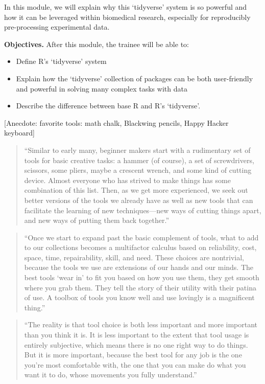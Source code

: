 \documentclass[]{tufte-book}
\providecommand{\tightlist}{%
  \setlength{\itemsep}{0pt}\setlength{\parskip}{0pt}}
\begin{document}
In this module, we will explain why this `tidyverse' system is so
powerful and how it can be leveraged within biomedical research, especially for
reproducibly pre-processing experimental data.

\textbf{Objectives.} After this module, the trainee will be able to:

\begin{itemize}
\tightlist
\item
  Define R's `tidyverse' system
\item
  Explain how the `tidyverse' collection of packages can be both user-friendly
  and powerful in solving many complex tasks with data
\item
  Describe the difference between base R and R's `tidyverse'.
\end{itemize}

{[}Anecdote: favorite tools: math chalk, Blackwing pencils, Happy Hacker keyboard{]}

\begin{quote}
``Similar to early many, beginner makers start with a rudimentary set of tools for
basic creative tasks: a hammer (of course), a set of screwdrivers, scissors,
some pliers, maybe a crescent wrench, and some kind of cutting device. Almost
everyone who has strived to make things has some combination of this list. Then,
as we get more experienced, we seek out better versions of the tools we already
have as well as new tools that can facilitate the learning of new techniques---new
ways of cutting things apart, and new ways of putting them back together.'' \citep{savage2020every}
\end{quote}

\begin{quote}
``Once we start to expand past the basic complement of tools, what to add to our
collections becomes a multifactor calculus based on reliability, cost, space, time,
repairability, skill, and need. These choices are nontrivial, because the tools we use
are extensions of our hands and our minds. The best tools `wear in' to fit you based
on how you use them, they get smooth where you grab them. They tell the story of their
utility with their patina of use. A toolbox of tools you know well and use lovingly is
a magnificent thing.'' \citep{savage2020every}
\end{quote}

\begin{quote}
``The reality is that tool choice is both less important and more important than you
think it is. It is less important to the extent that tool usage is entirely
subjective, which means there is no one right way to do things. But it is more
important, because the best tool for any job is the one you're most comfortable with,
the one that you can make do what you want it to do, whose movements you fully
understand.'' \citep{savage2020every}
\end{quote}
\end{document}
